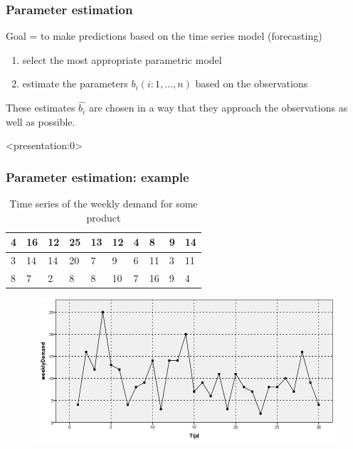 \documentclass{beamer}
\begin{document}
\begin{frame}
  \frametitle{Parameter estimation}

  Goal = to make predictions based on the time series model (forecasting)

  \begin{enumerate}
    \item select the most appropriate parametric model
    \item estimate the parameters $b_i (i: 1, \dots, n)$ based on the observations
  \end{enumerate}

  These estimates $\widehat{b_i}$ are chosen in a way that they approach the observations as well as possible.
\end{frame}

\begin{frame}<presentation:0> %
  \frametitle{Parameter estimation: example}

  \begin{table}[t]
    \centering
    \begin{tabular}{|l|l|l|l|l|l|l|l|l|l|}
      \hline
      4 & 16 & 12 & 25 & 13 & 12 & 4 & 8  & 9 & 14 \\ \hline
      3 & 14 & 14 & 20 & 7  & 9  & 6 & 11 & 3 & 11 \\ \hline
      8 & 7  & 2  & 8  & 8  & 10 & 7 & 16 & 9 & 4  \\ \hline
    \end{tabular}
    \label{tab:data}
    \caption{Time series of the weekly demand for some product}
  \end{table}

  \begin{figure}
    \centering
    \includegraphics[width=.7\textwidth]{img/tijdreeks11}
  \end{figure}
\end{frame}
\end{document}
